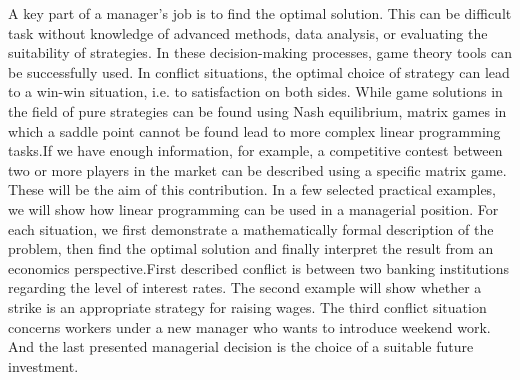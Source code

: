 
\begin{Abstrakt}
    A key part of a manager's job is to find the optimal solution. This can be difficult task without knowledge of advanced methods, data analysis, or evaluating the suitability of strategies. In these decision-making processes, game theory tools can be successfully used. In conflict situations, the optimal choice of strategy can lead to a win-win situation, i.e. to satisfaction on both sides. While game solutions in the field of pure strategies can be found using Nash equilibrium, matrix games in which a saddle point cannot be found lead to more complex linear programming tasks.\newline If we have enough information, for example, a competitive contest between two or more players in the market can be described using a specific matrix game. These will be the aim of this contribution. In a few selected practical examples, we will show how linear programming can be used in a managerial position. For each situation, we first demonstrate a mathematically formal description of the problem, then find the optimal solution and finally interpret the result from an economics perspective.\newline First described conflict is between two banking institutions regarding the level of interest rates. The second example will show whether a strike is an appropriate strategy for raising wages. The third conflict situation concerns workers under a new manager who wants to introduce weekend work. And the last presented managerial decision is the choice of a suitable future investment.
\end{Abstrakt}



\clearpage